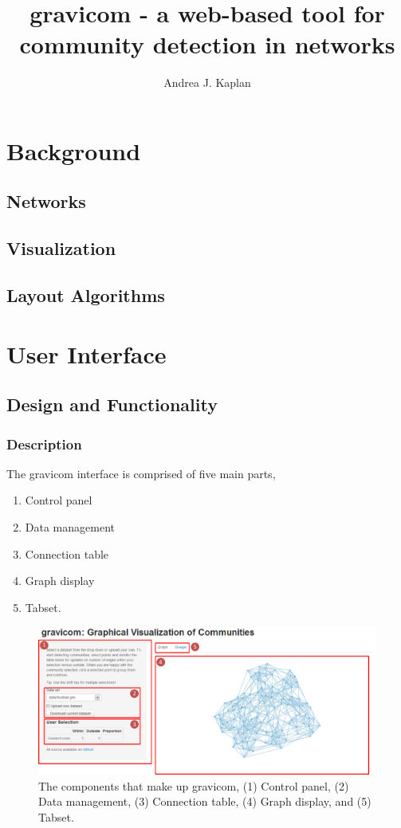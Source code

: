 \documentclass{article}
\title{gravicom - a web-based tool for community detection in networks}
\author{Andrea J. Kaplan}
\begin{document}
\maketitle
\section{Background}
\subsection{Networks}
\subsection{Visualization}
\subsection{Layout Algorithms}

\section{User Interface}
\subsection{Design and Functionality}

\subsubsection{Description}

The gravicom interface is comprised of five main parts,
\begin{enumerate}
\item Control panel
\item Data management
\item Connection table 
\item Graph display
\item Tabset.
\end{enumerate}

\begin{figure}[H]
\centering
\includegraphics[width=\textwidth]{images/sitecomponents.png}
\caption{\label{fig:sitecomponents} The components that make up gravicom, (1) Control panel, (2) Data management, (3) Connection table, (4) Graph display, and (5) Tabset.}
\end{figure}
\end{document}
